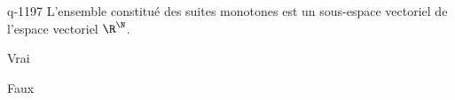 \begin{truefalse}{q-1197}
L'ensemble constitué des suites monotones est un sous-espace vectoriel de l'espace vectoriel $\R^\N$.
\item Vrai
\item* Faux
\end{truefalse}

